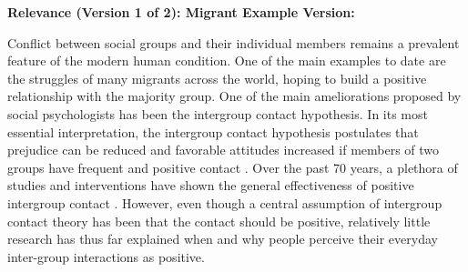 \documentclass[man, 12pt, a4paper]{apa7}
\theoremstyle{break}
\theoremstyle{plain}
\begin{document}
%
%
%

\textbf{Relevance (Version 1 of 2): Migrant Example Version:}

Conflict between social groups and their individual members remains a prevalent feature of the modern human condition. One of the main examples to date are the struggles of many migrants across the world, hoping to build a positive relationship with the majority group. One of the main ameliorations proposed by social psychologists has been the intergroup contact hypothesis. In its most essential interpretation, the intergroup contact hypothesis postulates that prejudice can be reduced and favorable attitudes increased if members of two groups have frequent and positive contact \citep[e.g.,][]{Allport1954b, Hewstone1996, Pettigrew1998}. Over the past 70 years, a plethora of studies and interventions have shown the general effectiveness of positive intergroup contact \citep[e.g.,][]{Pettigrew2006}. However, even though a central assumption of intergroup contact theory has been that the contact should be positive, relatively little research has thus far explained when and why people perceive their everyday inter-group interactions as positive.
\end{document}
